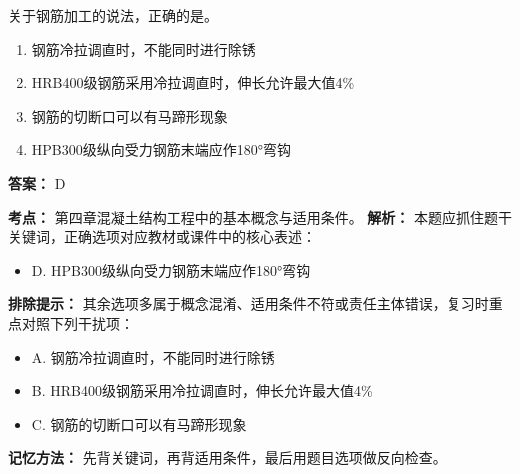 \documentclass[UTF8,fontset=fandol,11pt]{ctexart}
\begin{document}
\begin{quizbox}[title={第 30 题}]
关于钢筋加工的说法，正确的是。\\
\begin{enumerate}[label=\Alph*.]
\item 钢筋冷拉调直时，不能同时进行除锈
\item HRB400级钢筋采用冷拉调直时，伸长允许最大值4\%
\item 钢筋的切断口可以有马蹄形现象
\item HPB300级纵向受力钢筋末端应作180°弯钩
\end{enumerate}
\textbf{答案：} D
\vspace{0.25em}
\begin{answerbox}[title={考点解析}]
\textbf{考点：} 第四章混凝土结构工程中的基本概念与适用条件。
\textbf{解析：} 本题应抓住题干关键词，正确选项对应教材或课件中的核心表述：
\begin{itemize}
\item D. HPB300级纵向受力钢筋末端应作180°弯钩
\end{itemize}
\textbf{排除提示：} 其余选项多属于概念混淆、适用条件不符或责任主体错误，复习时重点对照下列干扰项：
\begin{itemize}
\item A. 钢筋冷拉调直时，不能同时进行除锈
\item B. HRB400级钢筋采用冷拉调直时，伸长允许最大值4\%
\item C. 钢筋的切断口可以有马蹄形现象
\end{itemize}
\textbf{记忆方法：} 先背关键词，再背适用条件，最后用题目选项做反向检查。
\end{answerbox}
\end{quizbox}
\end{document}
